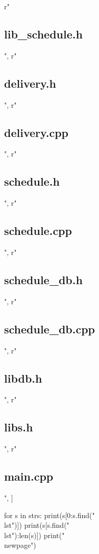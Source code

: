     r"\subsection*{lib\_schedule.h}",
    r"\subsection*{delivery.h}",
    r"\subsection*{delivery.cpp}",
    r"\subsection*{schedule.h}",
    r"\subsection*{schedule.cpp}",
    r"\subsection*{schedule\_db.h}",
    r"\subsection*{schedule\_db.cpp}",
    r"\subsection*{libdb.h}",
    r"\subsection*{libs.h}",
    r"\subsection*{main.cpp}",
]

for s in strs:
    print(s[0:s.find("\\lst")])
    print(s[s.find("\\lst"):len(s)])
    print("\\newpage\n")